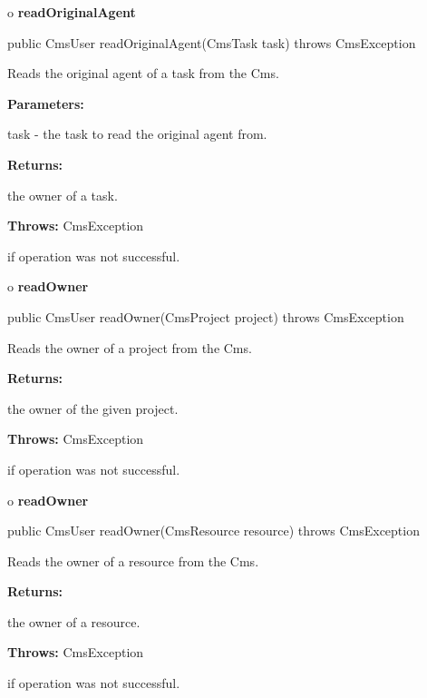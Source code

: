 o {\bf readOriginalAgent} 

\begin{PRE}
 public CmsUser readOriginalAgent(CmsTask task) throws CmsException
\end{PRE}

\begin{description}
\htmlDD Reads the original agent of a task from the Cms. 

\begin{description}
\item {\bf Parameters:}  

task - the task to read the original agent from.  
\item {\bf Returns:}  

the owner of a task.  
\item {\bf Throws:} CmsException  

if operation was not successful.  
\end{description}

\end{description}

o {\bf readOwner} 

\begin{PRE}
 public CmsUser readOwner(CmsProject project) throws CmsException
\end{PRE}

\begin{description}
\htmlDD Reads the owner of a project from the Cms. 

\begin{description}
\item {\bf Returns:}  

the owner of the given project.  
\item {\bf Throws:} CmsException  

if operation was not successful.  
\end{description}

\end{description}

o {\bf readOwner} 

\begin{PRE}
 public CmsUser readOwner(CmsResource resource) throws CmsException
\end{PRE}

\begin{description}
\htmlDD Reads the owner of a resource from the Cms. 

\begin{description}
\item {\bf Returns:}  

the owner of a resource.  
\item {\bf Throws:} CmsException  

if operation was not successful.  
\end{description}

\end{description}

